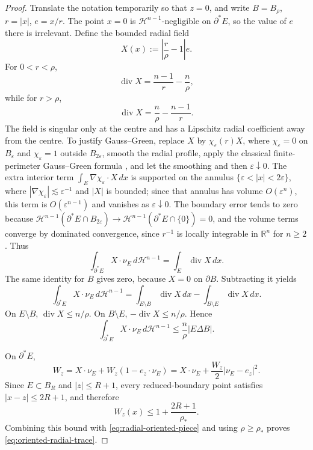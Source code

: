 \documentclass[11pt]{amsart}
\theoremstyle{definition}
\newcommand{\R}{\mathbb R}
\newcommand{\rstar}{\rho_*}
\newcommand{\eps}{\varepsilon}
\newcommand{\Hn}{\mathcal H^{n-1}}
\begin{document}
\begin{proof}
Translate the notation temporarily so that \(z=0\), and write
\(B=B_\rho\), \(r=|x|\), \(e=x/r\).  The point \(x=0\) is
\(\Hn\)-negligible on \(\partial^*E\), so the value of \(e\) there is
irrelevant.  Define the bounded radial field
\[
   X(x):=\left|\frac{r}{\rho}-1\right|e .
\]
For \(0<r<\rho\),
\[
   \operatorname{div}X=\frac{n-1}{r}-\frac n\rho,
\]
while for \(r>\rho\),
\[
   \operatorname{div}X=\frac n\rho-\frac{n-1}{r}.
\]
The field is singular only at the centre and has a Lipschitz radial
coefficient away from the centre.  To justify Gauss--Green, replace \(X\)
by \(\chi_\eps(r)X\), where \(\chi_\eps=0\) on \(B_\eps\) and
\(\chi_\eps=1\) outside \(B_{2\eps}\), smooth the radial profile, apply the
classical finite-perimeter Gauss--Green formula \cite{Maggi2012}, and let the
smoothing and then \(\eps\downarrow0\).  The extra interior term
\(\int_E\nabla\chi_\eps\cdot X\,dx\) is supported on the annulus
\(\{\eps<|x|<2\eps\}\), where \(|\nabla\chi_\eps|\lesssim\eps^{-1}\) and
\(|X|\) is bounded; since that annulus has volume \(O(\eps^n)\), this term is
\(O(\eps^{n-1})\) and vanishes as \(\eps\downarrow0\).  The boundary error
tends to zero because
\(\Hn(\partial^*E\cap B_{2\eps})\to \Hn(\partial^*E\cap\{0\})=0\), and the
volume terms converge by dominated convergence, since \(r^{-1}\) is locally
integrable in \(\R^n\) for \(n\ge2\).  Thus
\[
   \int_{\partial^*E}X\cdot\nu_E\,d\Hn
   =
   \int_E\operatorname{div}X\,dx .
\]
The same identity for \(B\) gives zero, because \(X=0\) on \(\partial B\).
Subtracting it yields
\[
   \int_{\partial^*E}X\cdot\nu_E\,d\Hn
   =
   \int_{E\setminus B}\operatorname{div}X\,dx
   -
   \int_{B\setminus E}\operatorname{div}X\,dx .
\]
On \(E\setminus B\), \(\operatorname{div}X\le n/\rho\).  On
\(B\setminus E\), \(-\operatorname{div}X\le n/\rho\).  Hence
\begin{equation}\label{eq:radial-oriented-piece}
   \int_{\partial^*E}X\cdot\nu_E\,d\Hn
   \le \frac n\rho |E\Delta B|.
\end{equation}

On \(\partial^*E\),
\[
   W_z = X\cdot\nu_E + W_z(1-e_z\cdot\nu_E)
       = X\cdot\nu_E + \frac{W_z}{2}|\nu_E-e_z|^2 .
\]
Since \(E\subset B_R\) and \(|z|\le R+1\), every reduced-boundary point
satisfies \(|x-z|\le2R+1\), and therefore
\[
   W_z(x)\le 1+\frac{2R+1}{\rstar}.
\]
Combining this bound with \eqref{eq:radial-oriented-piece} and using
\(\rho\ge\rstar\) proves \eqref{eq:oriented-radial-trace}.
\end{proof}
\end{document}
